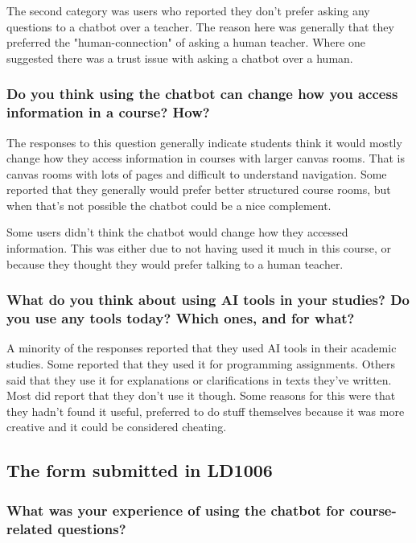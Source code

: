 The second category was users who reported they don’t prefer asking any questions to a chatbot over a teacher. The reason here was generally that they preferred the "human-connection" of asking a human teacher. Where one suggested there was a trust issue with asking a chatbot over a human.


\subsubsection{Do you think using the chatbot can change how you access information in a course? How?}


The responses to this question generally indicate students think it would mostly change how they access information in courses with larger canvas rooms. That is canvas rooms with lots of pages and difficult to understand navigation. Some reported that they generally would prefer better structured course rooms, but when that’s not possible the chatbot could be a nice complement.


Some users didn’t think the chatbot would change how they accessed information. This was either due to not having used it much in this course, or because they thought they would prefer talking to a human teacher.


\subsubsection{What do you think about using AI tools in your studies? Do you use any tools today? Which ones, and for what?}


A minority of the responses reported that they used AI tools in their academic studies. Some reported that they used it for programming assignments. Others said that they use it for explanations or clarifications in texts they’ve written. Most did report that they don’t use it though. Some reasons for this were that they hadn’t found it useful, preferred to do stuff themselves because it was more creative and it could be considered cheating.


\subsection{The form submitted in LD1006}


\subsubsection{What was your experience of using the chatbot for course-related questions?}


